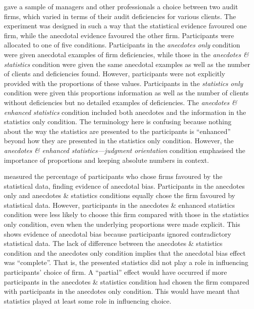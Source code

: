 \documentclass[a4paper, nobind]{templates/ociamthesis}
\theoremstyle{definition}
\theoremstyle{definition}
\theoremstyle{definition}
\theoremstyle{definition}
\theoremstyle{remark}
\begin{document}
\textcite{wainberg2013} gave a sample of managers and other professionals a choice between
two audit firms, which varied in terms of their audit deficiencies for various
clients. The experiment was designed in such a way that the statistical evidence
favoured one firm, while the anecdotal evidence favoured the other firm.
Participants were allocated to one of five conditions. Participants in the
\emph{anecdotes only} condition were given anecdotal examples of firm deficiencies,
while those in the \emph{anecdotes \& statistics} condition were given the same
anecdotal examples as well as the number of clients and deficiencies found.
However, participants were not explicitly provided with the proportions of these
values. Participants in the \emph{statistics only} condition were given this
proportions information as well as the number of clients without deficiencies
but no detailed examples of deficiencies. The \emph{anecdotes \& enhanced statistics}
condition included both anecdotes and the information in the statistics only
condition. The terminology here is confusing because nothing about the way the
statistics are presented to the participants is ``enhanced'' beyond how they are
presented in the statistics only condition. However, the \emph{anecdotes \& enhanced
statistics---judgment orientation} condition emphasised the importance of
proportions and keeping absolute numbers in context.

\textcite{wainberg2013} measured the percentage of participants who chose firms favoured
by the statistical data, finding evidence of anecdotal bias. Participants in the
anecdotes only and anecdotes \& statistics conditions equally chose the firm
favoured by statistical data. However, participants in the anecdotes \& enhanced
statistics condition were less likely to choose this firm compared with those in
the statistics only condition, even when the underlying proportions were made
explicit. This shows evidence of anecdotal bias because participants ignored
contradictory statistical data. The lack of difference between the anecdotes \&
statistics condition and the anecdotes only condition implies that the anecdotal
bias effect was ``complete''. That is, the presented statistics did not play a
role in influencing participants' choice of firm. A ``partial'' effect would have
occurred if more participants in the anecdotes \& statistics condition had chosen
the firm compared with participants in the anecdotes only condition. This would
have meant that statistics played at least some role in influencing choice.
\end{document}
